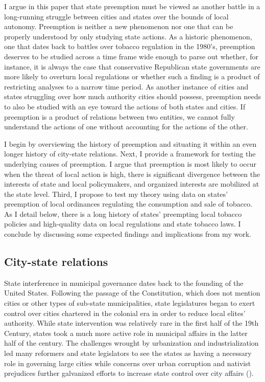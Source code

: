 \documentclass[12pt]{article}
\begin{document}
I argue in this paper that state preemption must be viewed as another battle in a long-running struggle between cities and states over the bounds of local autonomy. Preemption is neither a new phenomenon nor one that can be properly understood by only studying state actions. As a historic phenomenon, one that dates back to battles over tobacco regulation in the 1980's, preemption deserves to be studied across a time frame wide enough to parse out whether, for instance, it is always the case that conservative Republican state governments are more likely to overturn local regulations or whether such a finding is a product of restricting analyses to a narrow time period. As another instance of cities and states struggling over how much authority cities should possess, preemption needs to also be studied with an eye toward the actions of both states and cities. If preemption is a product of relations between two entities, we cannot fully understand the actions of one without accounting for the actions of the other.

I begin by overviewing the history of preemption and situating it within an even longer history of city-state relations. Next, I provide a framework for testing the underlying causes of preemption. I argue that preemption is most likely to occur when the threat of local action is high, there is significant divergence between the interests of state and local policymakers, and organized interests are mobilized at the state level. Third, I propose to test my theory using data on states' preemption of local ordinances regulating the consumption and sale of tobacco. As I detail below, there is a long history of states' preempting local tobacco policies and high-quality data on local regulations and state tobacco laws. I conclude by discussing some expected findings and implications from my work. 

\subsection*{City-state relations}
State interference in municipal governance dates back to the founding of the United States. Following the passage of the Constitution, which does not mention cities or other types of sub-state municipalities, state legislatures began to exert control over cities chartered in the colonial era in order to reduce local elites' authority. While state intervention was relatively rare in the first half of the 19th Century, states took a much more active role in municipal affairs in the latter half of the century. The challenges wrought by urbanization and industrialization led many reformers and state legislators to see the states as having a necessary role in governing large cities while concerns over urban corruption and nativist prejudices further galvanized efforts to increase state control over city affairs (\cites[p. 53-57]{bermanLocalGovernmentStates2003}[p. 9]{kraneHomeRuleAmerica2000}). 
\end{document}

